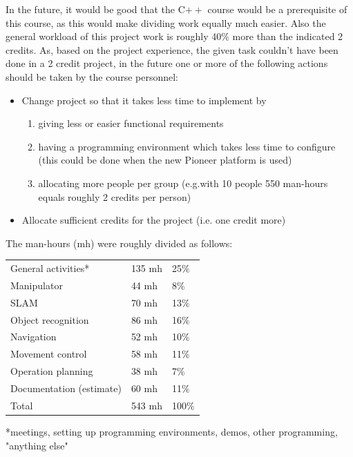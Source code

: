 \documentclass[a4paper,10pt]{article}
\begin{document}
In the future, it would be good that the C$++$ course would be a prerequisite of this course, as this would make dividing work equally much easier. Also the general workload of this project work is roughly 40$\%$ more than the indicated 2 credits. As, based on the project experience, the given task couldn't have been done in a 2 credit project, in the future one or more of the following actions should be taken by the course personnel:
\begin{itemize}
\item Change project so that it takes less time to implement by

\begin{enumerate}
\item giving less or easier functional requirements
\item having a programming environment which takes less time to configure (this could be done when the new Pioneer platform is used)
\item allocating more people per group (e.g.with 10 people 550 man-hours equals roughly 2 credits per person)
\end{enumerate}

\item Allocate sufficient credits for the project (i.e. one credit more)
\end{itemize}


The man-hours (mh) were roughly divided as follows:

\begin{center}

\begin{tabular}{l|l|l}


General activities* & 135 mh & 	25$\%$ \\
Manipulator & 44 mh	& 8$\%$ \\
SLAM	 & 70 mh	 & 13$\%$ \\
Object recognition & 86 mh & 16$\%$ \\
Navigation & 52 mh & 10$\%$ \\
Movement control & 58 mh	 & 11$\%$ \\
Operation planning & 38 mh &7$\%$ \\
Documentation (estimate)	 & 60 mh & 11$\%$ \\
Total & 543 mh & 100$\%$ \\

\end{tabular}
\end{center}

*meetings, setting up programming environments, demos, other programming, "anything else"\\
\end{document}

